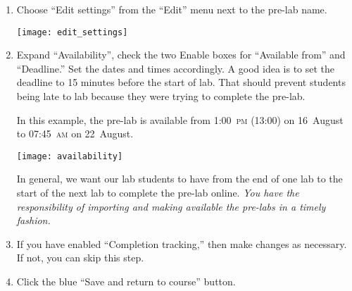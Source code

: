 \documentclass[12pt]{article}
\begin{document}
\begin{enumerate}
	\item Choose ``Edit settings'' from the ``Edit'' menu next to the pre-lab name.
	
	{\centering
		\texttt{[image: edit\_settings]}\par
	}

	\item Expand ``Availability'', check the two Enable boxes for ``Available from'' and ``Deadline.'' Set the dates and times accordingly. A good idea is to set the deadline to 15 minutes before the start of lab. That should prevent students being late to lab because they were trying to complete the pre-lab.
	
	In this example, the pre-lab is available from 1:00~\textsc{pm} (13:00) on 16~August to 07:45~\textsc{am} on 22~August. 
	
	{\centering
		\texttt{[image: availability]}\par
	}

	In general, we want our lab students to have from the end of one lab to the start of the next lab to complete the pre-lab online. \emph{You have the responsibility of importing and making available the pre-labs in a timely fashion.}
	
	\item If you have enabled ``Completion tracking,'' then make changes as necessary. If not, you can skip this step. 
	
	\item Click the blue ``Save and return to course'' button.
	
\end{enumerate}
\end{document}

